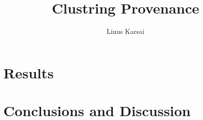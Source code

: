 \documentclass[BIT, graphvis, a4paper]{usydthesis}
\title{Clustring Provenance}
\begin{document}
\author{Linus Karsai}

\maketitle
\tableofcontents
\newpage\setcounter{page}{1}








\chapter{Results} %

\chapter{Conclusions and Discussion} %






\end{document}
